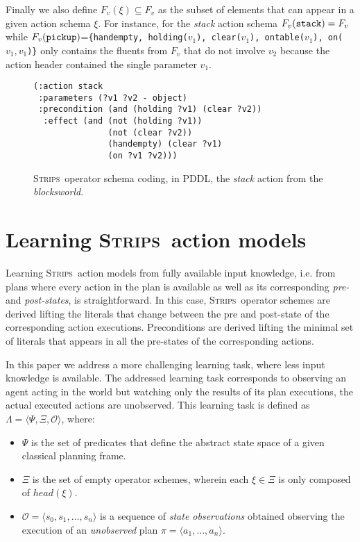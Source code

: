 \documentclass{article}
\newcommand{\tup}[1]{{\langle #1 \rangle}}
\newcommand{\strips}{\textsc{Strips}}     %
\begin{document}
Finally we also define $F_v(\xi)\subseteq F_v$ as the subset of elements that can appear in a given action schema $\xi$. For instance, for the {\em stack} action schema $F_v({\tt stack})=F_v$ while $F_v({\tt pickup})$={\small\tt\{handempty, holding($v_1$), clear($v_1$), ontable($v_1$), on($v_1,v_1$)\}} only contains the fluents from $F_v$ that do not involve $v_2$ because the action header contained the single parameter $v_1$.


\begin{figure}
\begin{footnotesize}
\begin{verbatim}
(:action stack
 :parameters (?v1 ?v2 - object)
 :precondition (and (holding ?v1) (clear ?v2))
  :effect (and (not (holding ?v1))
               (not (clear ?v2))
               (handempty) (clear ?v1)
               (on ?v1 ?v2)))
\end{verbatim}
\end{footnotesize}
 \caption{\small \strips\ operator schema coding, in PDDL, the {\em stack} action from the {\em blocksworld}.}
\label{fig:stack}
\end{figure}


\section{Learning \strips\ action models}
Learning \strips\ action models from fully available input knowledge, i.e. from plans where every action in the plan is available as well as its corresponding {\em pre-} and {\em post-states}, is straightforward. In this case, \strips\ operator schemes are derived lifting the literals that change between the pre and post-state of the corresponding action executions. Preconditions are derived lifting the minimal set of literals that appears in all the pre-states of the corresponding actions.

In this paper we address a more challenging learning task, where less input knowledge is available. The addressed learning task corresponds to observing an agent acting in the world but watching only the results of its plan executions, the actual executed actions are unobserved. This learning task is defined as $\Lambda=\tup{\Psi,\Xi,\mathcal{O}}$, where:
\begin{itemize}
\item $\Psi$ is the set of predicates that define the abstract state space of a given classical planning frame.
\item $\Xi$ is the set of empty operator schemes, wherein each $\xi\in\Xi$ is only composed of $head(\xi)$.
\item $\mathcal{O}=\tup{s_0,s_1,\ldots,s_{n}}$ is a sequence of {\em state observations} obtained observing the execution of an {\em unobserved} plan $\pi=\tup{a_1, \ldots, a_n}$.
\end{itemize}
\end{document}
